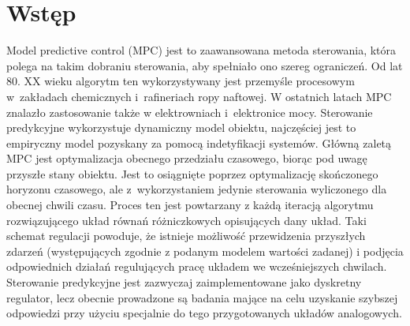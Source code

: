 \section{Wstęp}
Model predictive control (MPC) jest to zaawansowana metoda sterowania, która
polega na takim dobraniu sterowania, aby spełniało ono szereg ograniczeń. Od lat 80. XX wieku
algorytm ten wykorzystywany jest przemyśle procesowym w~zakładach chemicznych i~rafineriach 
ropy naftowej. W ostatnich latach MPC znalazło zastosowanie także w elektrowniach i~elektronice
mocy. Sterowanie predykcyjne wykorzystuje dynamiczny model obiektu, najczęściej jest to empiryczny
model pozyskany za pomocą indetyfikacji systemów. Główną zaletą MPC jest optymalizacja obecnego
przedziału czasowego, biorąc pod uwagę przyszłe stany obiektu. Jest to osiągnięte poprzez
optymalizację skończonego horyzonu czasowego, ale z~wykorzystaniem jedynie sterowania wyliczonego
dla obecnej chwili czasu. Proces ten jest powtarzany z każdą iteracją algorytmu rozwiązującego
układ równań różniczkowych opisujących dany układ. Taki schemat regulacji powoduje, że istnieje
możliwość przewidzenia przyszłych zdarzeń (występujących zgodnie z podanym modelem wartości zadanej)
i podjęcia odpowiednich działań regulujących pracę układem we wcześniejszych chwilach. Sterowanie
predykcyjne jest zazwyczaj zaimplementowane jako dyskretny regulator, lecz obecnie prowadzone są
badania mające na celu uzyskanie szybszej odpowiedzi przy użyciu specjalnie do tego przygotowanych
układów analogowych.

